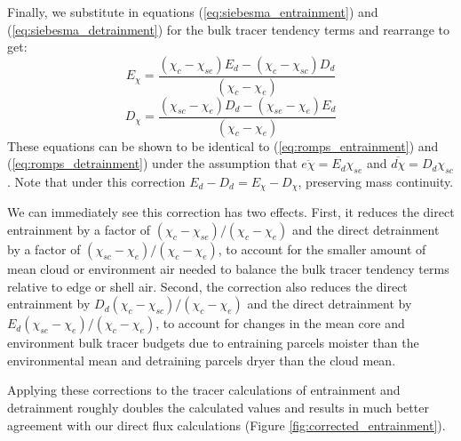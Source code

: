 \documentclass[draft,grl]{agutex}
\begin{document}
\begin{article}
Finally, we substitute in equations (\ref{eq:siebesma_entrainment}) and 
(\ref{eq:siebesma_detrainment}) for the bulk tracer tendency terms and 
rearrange to get:
\begin{equation}
  \label{eq:inverted_entrainment}
    E_{\chi} = \frac{(\chi_{c} - \chi_{se})E_d - (\chi_{c} - \chi_{sc})D_d}
             {(\chi_{c} - \chi_{e})}
\end{equation}
\begin{equation}
  \label{eq:inverted_detrainment}
    D_{\chi} = \frac{(\chi_{sc} - \chi_{e})D_d - (\chi_{se} - \chi_{e})E_d}
             {(\chi_{c} - \chi_{e})}
\end{equation}
These equations can be shown to be identical to (\ref{eq:romps_entrainment}) 
and (\ref{eq:romps_detrainment}) under the assumption that 
$\overline{e\chi} = E_d \chi_{se}$ and $\overline{d\chi} = D_d \chi_{sc}$.
Note that under this correction $E_d-D_d = E_{\chi}-D_{\chi}$, preserving 
mass continuity.

We can immediately see this correction has two effects.  First, it reduces
the direct entrainment by a factor of
$(\chi_{c} - \chi_{se})/(\chi_{c} - \chi_{e})$ and the direct detrainment 
by a factor of $(\chi_{sc} - \chi_{e})/(\chi_{c} - \chi_{e})$, to account for 
the smaller amount of mean cloud or environment air needed to balance the 
bulk tracer tendency terms relative to edge or shell air.  Second, the 
correction also reduces the direct entrainment by 
$D_d(\chi_{c} - \chi_{sc})/(\chi_{c} - \chi_{e})$ and the direct detrainment 
by $E_d(\chi_{se} - \chi_{e})/(\chi_{c} - \chi_{e})$, to account for changes 
in the mean core and environment bulk tracer budgets due to entraining 
parcels moister than the environmental mean and detraining parcels dryer than 
the cloud mean.  















Applying these corrections to the tracer calculations of entrainment and 
detrainment roughly doubles the calculated values and results in much better 
agreement with our direct flux calculations (Figure 
\ref{fig:corrected_entrainment}).




\end{article}
\end{document}
